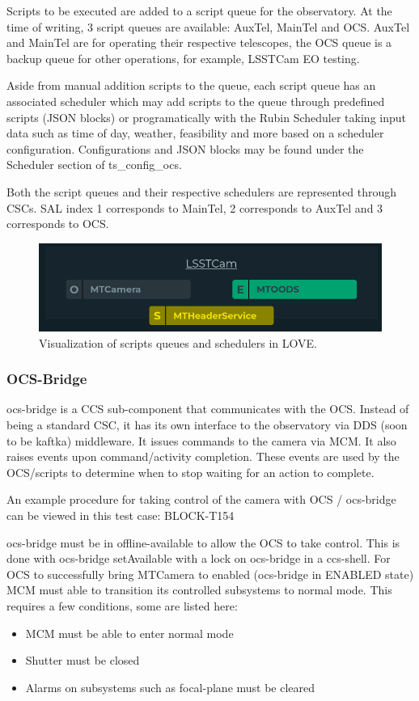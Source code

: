 Scripts to be executed are added to a script queue for the observatory. At the time of writing, 3 script queues are available: AuxTel, MainTel and OCS. AuxTel and MainTel are for operating their respective telescopes, the OCS queue is a backup queue for other operations, for example, LSSTCam EO testing.

Aside from manual addition scripts to the queue, each script queue has an associated scheduler which may add scripts to the queue through predefined scripts (JSON blocks) or programatically with the Rubin Scheduler taking input data such as time of day, weather, feasibility and more based on a scheduler configuration. Configurations and JSON blocks may be found under the Scheduler section of ts\_config\_ocs.

Both the script queues and their respective schedulers are represented through CSCs. SAL index 1 corresponds to MainTel, 2 corresponds to AuxTel and 3 corresponds to OCS.

\begin{figure}
    \centering
    \includegraphics[width=0.6\linewidth]{figures/appendixFigs/lsstcamcsc.png}
    \caption{Visualization of scripts queues and schedulers in LOVE.}
    \label{fig:app:schedulerscriptqueue.png}
\end{figure}

\subsubsection{OCS-Bridge}
ocs-bridge is a CCS sub-component that communicates with the OCS. Instead of being a standard CSC, it has its own interface to the observatory via DDS (soon to be kaftka) middleware. It issues commands to the camera via MCM. It also raises events upon command/activity completion. These events are used by the OCS/scripts to determine when to stop waiting for an action to complete.

An example procedure for taking control of the camera with OCS / ocs-bridge can be viewed in this test case: BLOCK-T154

ocs-bridge must be in offline-available to allow the OCS to take control. This is done with ocs-bridge setAvailable with a lock on ocs-bridge in a ccs-shell. For OCS to successfully bring MTCamera to enabled (ocs-bridge in ENABLED state) MCM must able to transition its controlled subsystems to normal mode. This requires a few conditions, some are listed here:
\begin{itemize}
    \item MCM must be able to enter normal mode
    \item Shutter must be closed
    \item Alarms on subsystems such as focal-plane must be cleared
\end{itemize}

